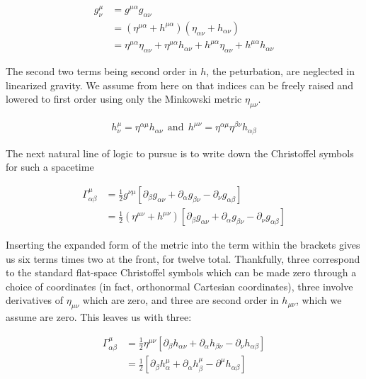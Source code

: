 \begin{align}
g^{\mu}_{\nu} &= g^{\mu \alpha}g_{\alpha \nu} \\
&= (\eta^{\mu \alpha} + h^{\mu \alpha}) (\eta_{\alpha \nu} + h_{\alpha \nu}) \\
&= \eta^{\mu \alpha}\eta_{\alpha \nu} + \eta^{\mu \alpha}h_{\alpha \nu} + h^{\mu \alpha}\eta_{\alpha \nu} + h^{\mu \alpha}h_{\alpha \nu}
\end{align} 

The second two terms being second order in $h$, the peturbation, are neglected in linearized gravity. We assume from here on that indices can be freely raised and lowered to first order using only the Minkowski metric $\eta_{\mu \nu}$.

\begin{align}
h^\mu_\nu = \eta^{\alpha \mu} h_{\alpha \nu} \ \  \text{and} \ \ h^{\mu \nu} = \eta^{\alpha \mu}\eta^{\beta \nu}h_{\alpha \beta}
\end{align}

The next natural line of logic to pursue is to write down the Christoffel symbols for such a spacetime

\begin{align}
\Gamma^{\mu}_{\alpha \beta} &= \frac{1}{2}g^{\nu \mu}\left[\partial_{\beta}g_{\alpha \nu} + \partial_{\alpha}g_{\beta \nu} - \partial_{\nu}g_{\alpha \beta}\right] \\
&= \frac{1}{2}\left(\eta^{\mu \nu} + h^{\mu \nu}\right)\left[\partial_{\beta}g_{\alpha \nu} + \partial_{\alpha}g_{\beta \nu} - \partial_{\nu}g_{\alpha \beta}\right]
\end{align}

Inserting the expanded form of the metric into the term within the brackets gives us six terms times two at the front, for twelve total. Thankfully, three correspond to the standard flat-space Christoffel symbols which can be made zero through a choice of coordinates (in fact, orthonormal Cartesian coordinates), three involve derivatives of $\eta_{\mu \nu}$ which are zero, and three are second order in $h_{\mu \nu}$, which we assume are zero. This leaves us with three:

\begin{align}\label{eq:linchrist}
\Gamma^{\mu}_{\alpha \beta} &= \frac{1}{2}\eta^{\mu \nu}\left[\partial_{\beta}h_{\alpha \nu} + \partial_{\alpha} h_{\beta \nu} - \partial_{\nu}h_{\alpha \beta}\right] \\
&= \frac{1}{2} \left[\partial_{\beta} h^{\mu}_{\alpha} + \partial_{\alpha}h_{\beta}^{\mu} - \partial^{\mu}h_{\alpha \beta}\right] 
\end{align} 

